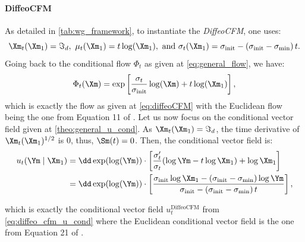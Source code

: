 \documentclass[10pt]{article} %
\theoremstyle{plain}
\theoremstyle{definition}
\theoremstyle{remark}
\begin{document}
\paragraph{DiffeoCFM}
As detailed in \cref{tab:wg_framework}, to instantiate the \emph{DiffeoCFM}, one uses:
$$\Xm_t(\Xm_1) = \Im_d, ~ \mu_t(\Xm_1) = t\log(\Xm_1), \text{ and } \sigma_t(\Xm_1) = \sigma_{\text{init}} - \left(\sigma_{\text{init}} - \sigma_{\min}\right)t.$$
Going back to the conditional flow $\Phi_t$ as given at \cref{eq:general_flow}, we have:
$$\Phi_t(\Xm) = \exp\left[\frac{\sigma_t}{\sigma_{\text{init}}}\log(\Xm) + t \log(\Xm_1)\right],$$
which is exactly the flow as given at \cref{eq:diffeoCFM} with the Euclidean flow being the one from Equation 11 of \citet{lipmanFlowMatchingGenerative2023}. Let us now focus on the conditional vector field given at \cref{theo:general_u_cond}. As $\Xm_t(\Xm_1) = \Im_d$, the time derivative of $\Xm_t(\Xm_1)^{1/2}$ is $0$, thus, $\Sm(t) =0$. Then, the conditional vector field is:
\begin{align*}
    u_t(\Ym \mid \Xm_1) &= \dd \exp(\log(\Ym))\cdot \left[\frac{\sigma_t'}{\sigma_t}(\log \Ym - t \log \Xm_1) + \log \Xm_1 \right] \\ 
                        &= \dd \exp(\log(\Ym))\cdot \left[\frac{\sigma_{\text{init}}\log \Xm_1 - \left(\sigma_{\text{init}} - \sigma_{\min}\right) \log \Ym}{ \sigma_{\text{init}} - \left(\sigma_{\text{init}} - \sigma_{\min}\right)t} \right],
\end{align*}

which is exactly the conditional vector field $u_t^{\text{DiffeoCFM}}$ from \cref{eq:diffeo_cfm_u_cond} where the Euclidean conditional vector field is the one from Equation 21 of \citet{lipmanFlowMatchingGenerative2023}.
\end{document}
